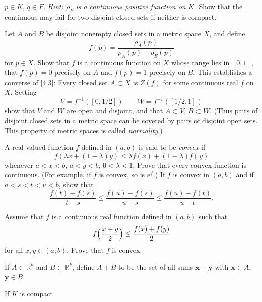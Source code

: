 \begin{exercise}
  \(p\in K\), \(q\in F\).
  \textit{Hint: \(\rho_F\) is a continuous positive function on \(K\).}
  Show that the continuous may fail for two disjoint closed sets if neither is
  compact.
\item
  Let \(A\) and \(B\) be disjoint nonempty closed sets in a metric space \(X\),
  and define
  \[
  f(p) = \frac{\rho_A(p)}{\rho_A(p) + \rho_E(p)}
  \]
  for \(p\in X\).
  Show that \(f\) is a continuous function on \(X\) whose range lies in
  \([0,1]\), that \(f(p) = 0\)  precisely on \(A\) and \(f(p) = 1\) precisely
  on \(B\).
  This establishes a converse of \cref{4.3}: Every closed set \(A\subset X\) is
  \(Z(f)\) for some continuous real \(f\) on \(X\).
  Setting
  \[
  V = f^{-1}([0, 1/2])\qquad W = f^{-1}([1/2, 1])
  \]
  show that \(V\) and \(W\) are open and disjoint, and that \(A\subset V\),
  \(B\subset W\).
  (Thus pairs of disjoint closed sets in a metric space can be covered by pairs
  of disjoint open sets.
  This property of metric spaces is called \textit{normality}.)
\item
  A real-valued function \(f\) defined in \((a,b)\) is said to be
  \textit{convex} if
  \[
  f(\lambda x + (1 - \lambda)y)\leq\lambda f(x) + (1 - \lambda)f(y)
  \]
  whenever \(a < x < b\), \(a < y < b\), \(0 < \lambda < 1\).
  Prove that every convex function is continuous.
  (For example, if \(f\) is convex, so is \(e^f\).)
  If \(f\) is convex in \((a,b)\) and if \(a < s < t < u < b\), show that
  \[
  \frac{f(t) - f(s)}{t - s}\leq\frac{f(u) - f(s)}{u - s}\leq
  \frac{f(u) - f(t)}{u - t}.
  \]
\item
  Assume that \(f\) is a continuous real function defined in \((a,b)\) such
  that
  \[
  f\Bigl(\frac{x + y}{2}\Bigr)\leq \frac{f(x) + f(y)}{2}
  \]
  for all \(x,y\in (a,b)\).
  Prove that \(f\) is convex.
\item
  If \(A\subset\mathbb{R}^k\) and \(B\subset\mathbb{R}^k\), define \(A + B\) to
  be the set of all sums \(\mathbold{x + y}\) with \(\mathbold{x}\in A\),
  \(\mathbold{y}\in B\).
  \begin{exercise}[label = (\alph*)]
  \item
    If \(K\) is compact
  \end{exercise}
\end{exercise}

